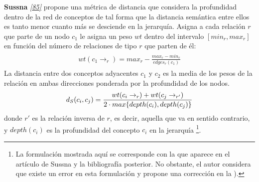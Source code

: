 \documentclass[a4paper,12pt,spanish]{book}
\begin{document}
\textbf{Sussna} \label{1.state-of-the-art/ii.medidas-distancia:id37}{\hyperref[zreferences:sussna1993]{\emph{{[}85{]}}}} propone una métrica de distancia que considera la profundidad
dentro de la red de conceptos de tal forma que la distancia semántica entre ellos es
tanto menor cuanto más se desciende en la jerarquía. Asigna a cada relación \(r\) que
parte de un nodo \(c_1\) le asigna un peso \(wt\) dentro del intervalo
\([min_r, max_r]\) en función del número de relaciones de tipo \(r\) que
parten de él:
\label{1.state-of-the-art/ii.medidas-distancia:equation-sussna}\begin{gather}
\begin{split}wt(c_1 \rightarrow_r) = max_r - \frac{max_r - min_r}{edges_r (c_1)}\end{split}\label{1.state-of-the-art/ii.medidas-distancia-sussna}
\end{gather}
La distancia entre dos conceptos adyacentes \(c_1\) y \(c_2\) es la media
de los pesos de la relación en ambas direcciones ponderada por la profundidad de los nodos.
\begin{gather}
\begin{split}d_{S}(c_i, c_j) = \frac{wt(c_i \rightarrow_r) + wt(c_j \rightarrow_{r'}) }{2 \cdot max\{depth(c_i), depth(c_j)\}}\end{split}\notag
\end{gather}
donde \(r'\) es la relación inversa de \(r\), es decir, aquella que va en sentido
contrario, y \(depth(c_i)\) es la profundidad del concepto \(c_i\) en la jerarquía \footnote{
La formulación mostrada aquí se corresponde con la que aparece en el artículo de Sussna y la
bibliografía posterior. No obstante, el autor considera que existe un error en esta formulación y
propone una corrección en la ).
}.
\end{document}
